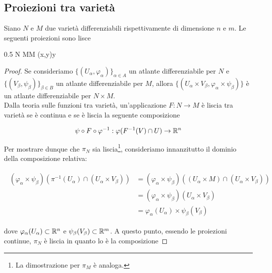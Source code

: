 \subsection{Proiezioni tra varietà}

\begin{definition}
	Siano $ N $ e $ M $ due varietà differenziabili rispettivamente di dimensione $ n $ e $ m $. Le seguenti proiezioni sono lisce
	
		{0.5}{%
					{N \times M}{M}
					{(x,y)}{y}
				}
\end{definition}

\begin{proof}
	Se consideriamo $ \{(U_{\alpha},\varphi_{\alpha})\}_{\alpha \in A} $ un atlante differenziabile per $ N $ e $ \{(V_{\beta},\psi_{\beta})\}_{\beta \in B} $ un atlante differenziabile per $ M $, allora $ \{(U_{\alpha} \times V_{\beta},\varphi_{\alpha} \times \psi_{\beta})\} $ è un atlante differenziabile per $ N \times M $. \\
	Dalla teoria sulle funzioni tra varietà, un'applicazione $ F : N \to M $ è liscia tra varietà se è continua e se è liscia la seguente composizione
	
	\begin{equation}
		\psi \circ F \circ \varphi^{-1} : \varphi(F^{-1}(V) \cap U) \to \mathbb{R}^{n}
	\end{equation}
	
	Per mostrare dunque che $ \pi_{N} $ sia liscia\footnote{%
		La dimostrazione per $ \pi_{M} $ è analoga.%
	}, consideriamo innanzitutto il dominio della composizione relativa:
	
	\begin{align}
		\begin{split}
			(\varphi_{\alpha} \times \psi_{\beta})(\pi^{-1}(U_{\alpha}) \cap (U_{\alpha} \times V_{\beta})) &= (\varphi_{\alpha} \times \psi_{\beta})((U_{\alpha} \times M) \cap (U_{\alpha} \times V_{\beta})) \\
			&= (\varphi_{\alpha} \times \psi_{\beta})(U_{\alpha} \times V_{\beta}) \\
			&= \varphi_{\alpha}(U_{\alpha}) \times \psi_{\beta}(V_{\beta})
		\end{split}	
	\end{align}
	
	dove $ \varphi_{\alpha}(U_{\alpha}) \subset \mathbb{R}^{n} $ e $ \psi_{\beta}(V_{\beta}) \subset \mathbb{R}^{m} $. A questo punto, essendo le proiezioni continue, $ \pi_{N} $ è liscia in quanto lo è la composizione
	

\end{proof}
